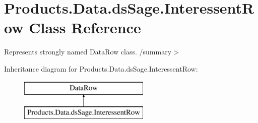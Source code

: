 \hypertarget{class_products_1_1_data_1_1ds_sage_1_1_interessent_row}{}\section{Products.\+Data.\+ds\+Sage.\+Interessent\+Row Class Reference}
\label{class_products_1_1_data_1_1ds_sage_1_1_interessent_row}


Represents strongly named Data\+Row class. /summary$>$  


Inheritance diagram for Products.\+Data.\+ds\+Sage.\+Interessent\+Row\+:\begin{figure}[H]
\begin{center}
\leavevmode
\includegraphics[height=2.000000cm]{class_products_1_1_data_1_1ds_sage_1_1_interessent_row}
\end{center}
\end{figure}
